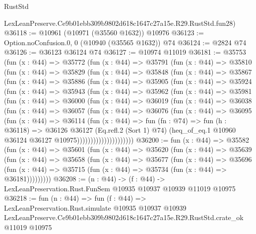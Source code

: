 \begin{lexlean}{RustStd}
\begin{coremodule}
    LexLeanPreserve.Ce9b01ebb309b9802d618c1647c27a15e.R29.RustStd.fun28)
@36118 := @10961 (@10971 (@35560 @1632)) @10976
@36123 := Option.noConfusion.{0, 0} (@10940 (@35565 @1632)) @74
@36124 := @2824 @74
@36126 := @36123 @36124 @74
@36127 := @10974 @11019
@36181 := @35753
    (fun (x : @44) =>
    @35772
      (fun (x : @44) =>
      @35791
        (fun (x : @44) =>
        @35810
          (fun (x : @44) =>
          @35829
            (fun (x : @44) =>
            @35848
              (fun (x : @44) =>
              @35867
                (fun (x : @44) =>
                @35886
                  (fun (x : @44) =>
                  @35905
                    (fun (x : @44) =>
                    @35924
                      (fun (x : @44) =>
                      @35943
                        (fun (x : @44) =>
                        @35962
                          (fun (x : @44) =>
                          @35981
                            (fun (x : @44) =>
                            @36000
                              (fun (x : @44) =>
                              @36019
                                (fun (x : @44) =>
                                @36038
                                  (fun (x : @44) =>
                                  @36057
                                    (fun (x : @44) =>
                                    @36076
                                      (fun (x : @44) =>
                                      @36095
                                        (fun (x : @44) =>
                                        @36114
                                          (fun (x : @44) =>
                                          fun (fn : @74) =>
                                          fun (h : @36118) =>
                                          @36126
                                            @36127
                                            (Eq.refl.{2} (Sort 1) @74)
                                            (heq_of_eq.{1}
                                              @10960
                                              @36124
                                              @36127
                                              @10975)))))))))))))))))))))
@36200 := fun (x : @44) =>
  @35582
    (fun (x : @44) =>
    @35601
      (fun (x : @44) =>
      @35620
        (fun (x : @44) =>
        @35639
          (fun (x : @44) =>
          @35658
            (fun (x : @44) =>
            @35677
              (fun (x : @44) =>
              @35696
                (fun (x : @44) => @35715 (fun (x : @44) => @35734 (fun (x : @44) => @36181)))))))))
@36208 := (n : @44) ->
  (f : @44) -> LexLeanPreservation.Rust.FunSem @10935 @10937 @10939 @11019 @10975
@36218 := fun (n : @44) =>
  fun (f : @44) =>
  LexLeanPreservation.Rust.simulate
    @10935
    @10937
    @10939
    LexLeanPreserve.Ce9b01ebb309b9802d618c1647c27a15e.R29.RustStd.crate_ok
    @11019
    @10975
\end{coremodule}
\end{lexlean}
